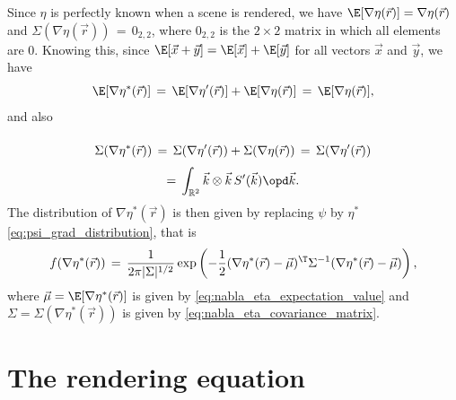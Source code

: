 Since $\eta$ is perfectly known when a scene is rendered, we have $\E[\nabla\eta(\vec{r})] = \nabla\eta(\vec{r})$ and $\Sigma(\nabla\eta(\vec{r})) \,=\, 0_{2,2}$, where $0_{2,2}$ is the $2\times 2$ matrix in which all elements are 0. Knowing this, since $\E[\vec{x}+\vec{y}] = \E[\vec{x}]+\E[\vec{y}]$ for all vectors $\vec{x}$ and $\vec{y}$, we have
%
\begin{equation} \label{eq:nabla_eta_expectation_value}
\E[\nabla\eta^*(\vec{r})] \,=\, \E[\nabla\eta'(\vec{r})] + \E[\nabla\eta(\vec{r})] \,=\, \E[\nabla\eta(\vec{r})],
\end{equation}
%
and also
%
\begin{equation} \label{eq:nabla_eta_covariance_matrix}
\renewcommand*{\arraystretch}{2}
\begin{array}{c}
\displaystyle \Sigma(\nabla\eta^*(\vec{r})) \,=\, \Sigma(\nabla\eta'(\vec{r})) + \Sigma(\nabla\eta(\vec{r})) \,=\, \Sigma(\nabla\eta'(\vec{r})) \\
\displaystyle =\, \int_{\mathbb{R}^2}\vec{k}\otimes\vec{k}\,S'(\vec{k})\opd\vec{k}.
\end{array}
\end{equation}
%
The distribution of $\nabla\eta^*(\vec{r})$ is then given by replacing $\psi$ by $\eta^*$ \eqref{eq:psi_grad_distribution}, that is
%
\begin{equation} \label{eq:eta_grad_distribution_r_uniformly_distributed}
f(\nabla\eta^*(\vec{r})) \,=\, \frac{1}{2\pi|\Sigma|^{1/2}}\exp\left(-\frac{1}{2}(\nabla\eta^*(\vec{r})-\vec{\mu})^{\T}\Sigma^{-1}(\nabla\eta^*(\vec{r})-\vec{\mu})\right),
\end{equation}
%
where $\vec{\mu} = \E[\nabla\eta^*(\vec{r})]$ is given by \eqref{eq:nabla_eta_expectation_value} and $\Sigma = \Sigma(\nabla\eta^*(\vec{r}))$ is given by \eqref{eq:nabla_eta_covariance_matrix}.

\section{The rendering equation}

